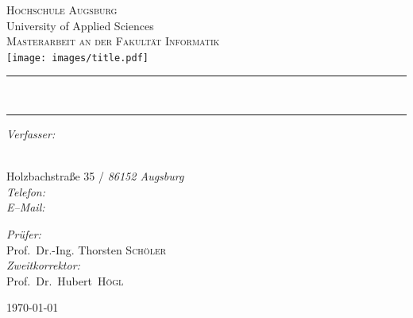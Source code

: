 \begin{titlepage}
\pagecolor{ThesisBackColor}
\begin{center}

\color{ThesisFontColor}
\textsc{\huge Hochschule Augsburg}\\[0.2cm]
\large University of Applied Sciences\\[1cm]
\textsc{\LARGE Masterarbeit an der Fakultät Informatik}\\[0.5cm]
\vspace{1em}
\texttt{[image: images/title.pdf]}~\\[1cm]


\rule{\linewidth}{0.5mm}

{\vspace{0.1cm}\Huge\bfseries \ThesisTitle\\[0.3cm]}
\rule{\linewidth}{0.5mm}

\vspace{0.5cm}

\noindent
\begin{minipage}[t]{0.4\textwidth}
\begin{flushleft} \large
\emph{Verfasser:}\\
\textnormal{\ThesisPreName~\textsc{\ThesisSurName}} \\
\vspace{1.2em}
\begin{singlespace}
  \normalsize
  \textnormal{Holzbachstraße 35} / \emph{86152 Augsburg} \\
  \emph{Telefon:} \texttt{\ThesisPhone} \\
  \emph{E--Mail:} \texttt{\ThesisMail}
\end{singlespace}
\end{flushleft}
\end{minipage}%
\begin{minipage}[t]{0.4\textwidth}
\begin{flushright} \large
\emph{Prüfer:} \\
\textnormal{Prof.\ Dr.-Ing. Thorsten \textsc{Schöler}} \\
\vspace{1em}
\emph{Zweitkorrektor:} \\
\textnormal{Prof.\ Dr.\ Hubert\  \textsc{Högl}} \\
\end{flushright}
\end{minipage}

\vfill

{\large \today}
\end{center}
\end{titlepage}
\nopagecolor

